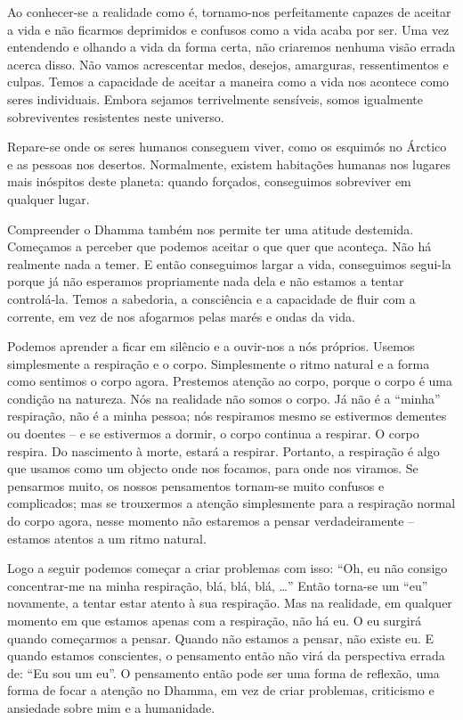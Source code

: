 Ao conhecer-se a realidade como é, tornamo-nos perfeitamente capazes de aceitar
a vida e não ficarmos deprimidos e confusos como a vida acaba por ser. Uma vez
entendendo e olhando a vida da forma certa, não criaremos nenhuma visão errada
acerca disso. Não vamos acrescentar medos, desejos, amarguras, ressentimentos e
culpas. Temos a capacidade de aceitar a maneira como a vida nos acontece como
seres individuais. Embora sejamos terrivelmente sensíveis, somos igualmente
sobreviventes resistentes neste universo.

Repare-se onde os seres humanos conseguem viver, como os esquimós no Árctico e
as pessoas nos desertos. Normalmente, existem habitações humanas nos lugares
mais inóspitos deste planeta: quando forçados, conseguimos sobreviver em
qualquer lugar.

Compreender o Dhamma também nos permite ter uma atitude destemida. Começamos a
perceber que podemos aceitar o que quer que aconteça. Não há realmente nada a
temer. E então conseguimos largar a vida, conseguimos segui-la porque já não
esperamos propriamente nada dela e não estamos a tentar controlá-la. Temos a
sabedoria, a consciência e a capacidade de fluir com a corrente, em vez de nos
afogarmos pelas marés e ondas da vida.

Podemos aprender a ficar em silêncio e a ouvir-nos a nós próprios. Usemos
simplesmente a respiração e o corpo. Simplesmente o ritmo natural e a forma como
sentimos o corpo agora. Prestemos atenção ao corpo, porque o corpo é uma
condição na natureza. Nós na realidade não somos o corpo. Já não é a ``minha''
respiração, não é a minha pessoa; nós respiramos mesmo se estivermos dementes ou
doentes -- e se estivermos a dormir, o corpo continua a respirar. O corpo
respira. Do nascimento à morte, estará a respirar. Portanto, a respiração é algo
que usamos como um objecto onde nos focamos, para onde nos viramos. Se pensarmos
muito, os nossos pensamentos tornam-se muito confusos e complicados; mas se
trouxermos a atenção simplesmente para a respiração normal do corpo agora, nesse
momento não estaremos a pensar verdadeiramente -- estamos atentos a um ritmo
natural.

Logo a seguir podemos começar a criar problemas com isso: ``Oh, eu não consigo
concentrar-me na minha respiração, blá, blá, blá, \ldots{}'' Então torna-se um
``eu'' novamente, a tentar estar atento à sua respiração. Mas na realidade, em
qualquer momento em que estamos apenas com a respiração, não há eu. O eu surgirá
quando começarmos a pensar. Quando não estamos a pensar, não existe eu. E quando
estamos conscientes, o pensamento então não virá da perspectiva errada de: ``Eu
sou um eu''. O pensamento então pode ser uma forma de reflexão, uma forma de
focar a atenção no Dhamma, em vez de criar problemas, criticismo e ansiedade
sobre mim e a humanidade.

